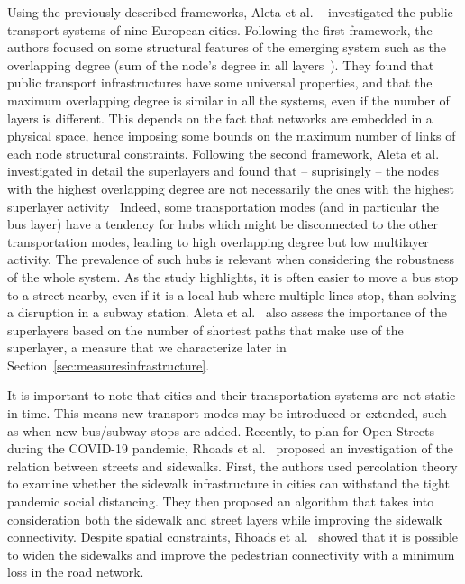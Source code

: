 Using the previously described frameworks, Aleta et al. ~\cite{Aleta2017Multilayer} investigated the public transport systems of nine European cities. Following the first framework, the authors focused on some structural features of the emerging system such as the overlapping degree (sum of the node's degree in all layers~\cite{battiston2014structural}). They found that public transport infrastructures have some universal properties, and that the maximum overlapping degree is similar in all the systems, even if the number of layers is different. This depends on the fact that networks are embedded in a physical space, hence imposing some bounds on the maximum number of links of each node structural constraints. Following the second framework, Aleta et al.~\cite{Aleta2017Multilayer} investigated in detail the superlayers and found that -- suprisingly -- the nodes with the highest overlapping degree are not necessarily the ones with the highest superlayer activity~\cite{nicosia2015measuring} Indeed, some transportation modes (and in particular the bus layer) have a tendency for hubs which might be disconnected to the other transportation modes, leading to high overlapping degree but low multilayer activity. The prevalence of such hubs is relevant when considering the robustness of the whole system. As the study highlights, it is often easier to move a bus stop to a street nearby, even if it is a local hub where multiple lines stop, than solving a disruption in a subway station. Aleta et al.~\cite{Aleta2017Multilayer} also assess the importance of the superlayers based on the number of shortest paths that make use of the superlayer, a measure that we characterize later in Section~\ref{sec:measuresinfrastructure}.

It is important to note that cities and their transportation systems are not static in time. This means new transport modes may be introduced or extended, such as when new bus/subway stops are added. Recently, to plan for Open Streets during the COVID-19 pandemic, Rhoads et al.~\cite{rhoads2020planning} proposed an investigation of the relation between streets and sidewalks. First, the authors used percolation theory to examine whether the sidewalk infrastructure in cities can withstand the tight pandemic social distancing. They then proposed an algorithm that takes into consideration both the sidewalk and street layers while improving the sidewalk connectivity. Despite spatial constraints, Rhoads et al.~\cite{rhoads2020planning} showed that it is possible to widen the sidewalks and improve the pedestrian connectivity with a minimum loss in the road network. 

